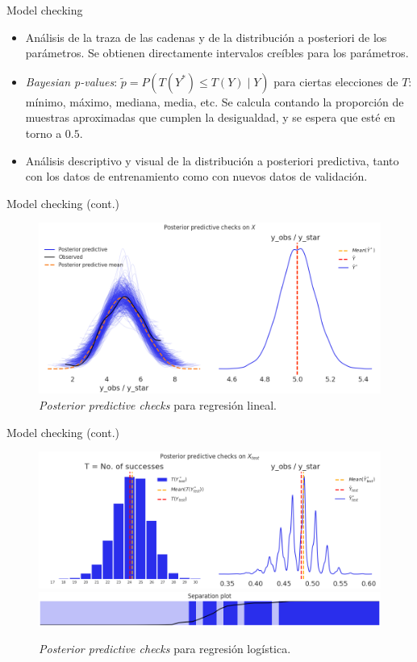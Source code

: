 \documentclass[10pt, english, professionalfonts]{beamer}
\newcommand\maroon[1]{\color{mLightBrown}#1\color{mDarkTeal}}
\begin{document}
\begin{frame}{Model checking}
  \begin{itemize}
    \item Análisis de la traza de las cadenas y de la distribución a posteriori de los parámetros. Se obtienen directamente \maroon{intervalos creíbles } para los parámetros.
    \item \textit{Bayesian p-values}: \(\tilde p=P(T(Y^*)\leq T(Y)\mid Y)\) para ciertas elecciones de \(T\): mínimo, máximo, mediana, media, etc. Se calcula contando la proporción de muestras aproximadas que cumplen la desigualdad, y se espera que esté en torno a \(0.5\).
    \item Análisis descriptivo y visual de la distribución a posteriori predictiva, tanto con los datos de entrenamiento como con nuevos datos de validación.
  \end{itemize}

\end{frame}

\begin{frame}{Model checking (cont.)}
  \begin{figure}
    \includegraphics[width=\textwidth]{img/ppc_linear}
    \caption{\textit{Posterior predictive checks} para regresión lineal.}
  \end{figure}
\end{frame}

\begin{frame}{Model checking (cont.)}
  \begin{figure}
    \includegraphics[width=\textwidth]{img/ppc_logistic1}
    \includegraphics[width=\textwidth]{img/ppc_logistic2}
    \caption{\textit{Posterior predictive checks} para regresión logística.}
  \end{figure}
\end{frame}
\end{document}
